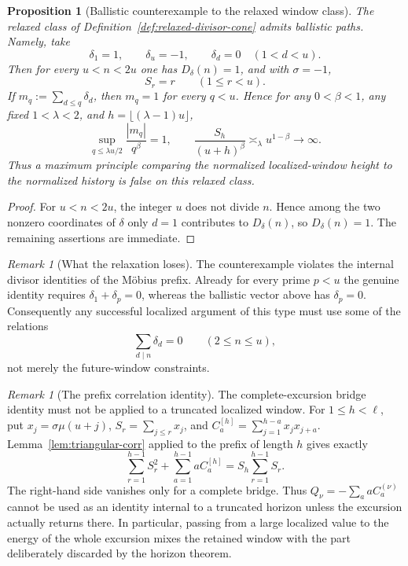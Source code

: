 \documentclass[11pt]{amsart}
\numberwithin{equation}{section}
\theoremstyle{plain}
\newtheorem{proposition}[theorem]{Proposition}
\theoremstyle{definition}
\theoremstyle{remark}
\newtheorem{remark}[theorem]{Remark}
\begin{document}
\begin{proposition}[Ballistic counterexample to the relaxed window class]
\label{prop:relaxed-ballistic}
The relaxed class of Definition~\ref{def:relaxed-divisor-cone} admits
ballistic paths.  Namely, take
\[
\delta_1=1,\qquad\delta_u=-1,\qquad\delta_d=0\quad(1<d<u).
\]
Then for every $u<n<2u$ one has $D_\delta(n)=1$, and with $\sigma=-1$,
\[
S_r=r\qquad(1\le r<u).
\]
If $m_q:=\sum_{d\le q}\delta_d$, then $m_q=1$ for every $q<u$.  Hence for
any $0<\beta<1$, any fixed $1<\lambda<2$, and
$h=\lfloor(\lambda-1)u\rfloor$,
\[
\sup_{q\le\lambda u/2}\frac{|m_q|}{q^\beta}=1,
\qquad
\frac{S_h}{(u+h)^\beta}\asymp_\lambda u^{1-\beta}\longrightarrow\infty.
\]
Thus a maximum principle comparing the normalized localized-window height
to the normalized history is false on this relaxed class.
\end{proposition}

\begin{proof}
For $u<n<2u$, the integer $u$ does not divide $n$.  Hence among the two
nonzero coordinates of $\delta$ only $d=1$ contributes to $D_\delta(n)$,
so $D_\delta(n)=1$.  The remaining assertions are immediate.
\end{proof}

\begin{remark}[What the relaxation loses]
\label{rem:relaxed-loses}
The counterexample violates the internal divisor identities of the M\"obius
prefix.  Already for every prime $p<u$ the genuine identity requires
$\delta_1+\delta_p=0$, whereas the ballistic vector above has
$\delta_p=0$.  Consequently any successful localized argument of this type
must use some of the relations
\[
\sum_{d\mid n}\delta_d=0\qquad(2\le n\le u),
\]
not merely the future-window constraints.
\end{remark}

\begin{remark}[The prefix correlation identity]
\label{rem:prefix-correlation}
The complete-excursion bridge identity must not be applied to a truncated
localized window.  For $1\le h<\ell$, put
$x_j=\sigma\mu(u+j)$,
$S_r=\sum_{j\le r}x_j$, and
$C_a^{[h]}=\sum_{j=1}^{h-a}x_jx_{j+a}$.  Lemma~\ref{lem:triangular-corr}
applied to the prefix of length $h$ gives exactly
\[
\sum_{r=1}^{h-1}S_r^2+\sum_{a=1}^{h-1}aC_a^{[h]}
=S_h\sum_{r=1}^{h-1}S_r.
\]
The right-hand side vanishes only for a complete bridge.  Thus
$Q_\nu=-\sum_a aC_a^{(\nu)}$ cannot be used as an identity internal to a
truncated horizon unless the excursion actually returns there.  In
particular, passing from a large localized value to the energy of the whole
excursion mixes the retained window with the part deliberately discarded by
the horizon theorem.
\end{remark}
\end{document}
